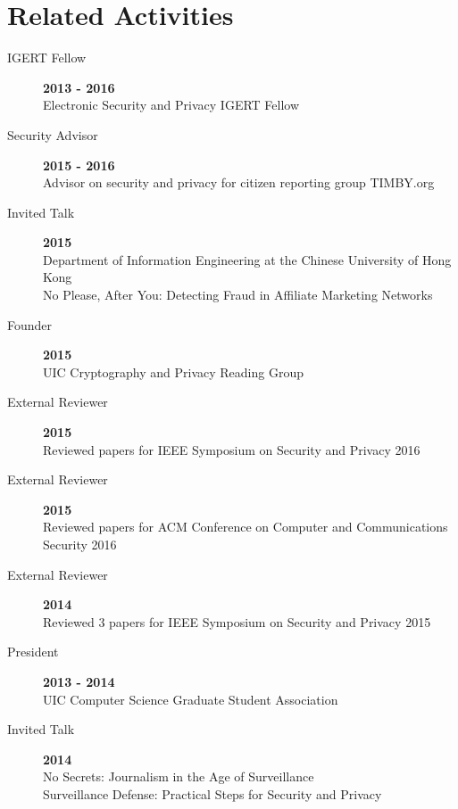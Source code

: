\documentclass{vitae}
\begin{document}
  \section{Related Activities}
  \begin{description}

    \item[IGERT Fellow] \hfill \textbf{2013 - 2016}\\
    Electronic Security and Privacy IGERT Fellow

    \item[Security Advisor] \hfill \textbf{2015 - 2016}\\
    Advisor on security and privacy for citizen reporting group TIMBY.org

    \item[Invited Talk] \hfill \textbf{2015}\\
    Department of Information Engineering at the Chinese University of Hong Kong\\
    No Please, After You: Detecting Fraud in Affiliate Marketing Networks

    \item[Founder] \hfill \textbf{2015}\\
    UIC Cryptography and Privacy Reading Group

    \item[External Reviewer] \hfill \textbf{2015}\\
    Reviewed papers for IEEE Symposium on Security and Privacy 2016

    \item[External Reviewer] \hfill \textbf{2015}\\
    Reviewed papers for ACM Conference on Computer and Communications Security 2016

    \item[External Reviewer] \hfill \textbf{2014}\\
    Reviewed 3 papers for IEEE Symposium on Security and Privacy 2015

    \item[President] \hfill \textbf{2013 - 2014}\\
    UIC Computer Science Graduate Student Association

    \item[Invited Talk] \hfill \textbf{2014}\\
    No Secrets: Journalism in the Age of Surveillance\\
    Surveillance Defense: Practical Steps for Security and Privacy


\end{description}
\end{document}

